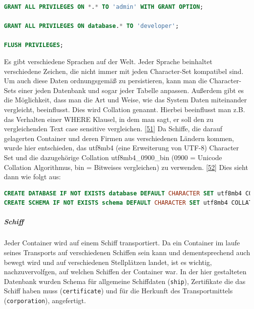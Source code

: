 \documentclass[
    headings=optiontotocandhead,%
    twoside,
    numbers=noenddot,%
    12pt, %
    titlepage, %
    parskip=full, %
    listof=leveldown, 
    numbers=noenddot, %
    a4paper,DIV=14,
    BCOR=15mm,
]{scrbook}
\newcommand{\passthrough}[1]{#1}
\begin{document}
\begin{lstlisting}[language=SQL, caption={Zuweisen von Rollen zu Benutzergruppen in MySQL}]
GRANT ALL PRIVILEGES ON *.* TO 'admin' WITH GRANT OPTION;

GRANT ALL PRIVILEGES ON database.* TO 'developer';

FLUSH PRIVILEGES;
\end{lstlisting}

Es gibt verschiedene Sprachen auf der Welt. Jeder Sprache beinhaltet
verschiedene Zeichen, die nicht immer mit jeden Character-Set kompatibel
sind. Um auch diese Daten ordnungsgemäß zu persistieren, kann man die
Character-Sets einer jeden Datenbank und sogar jeder Tabelle anpassen.
Außerdem gibt es die Möglichkeit, dass man die Art und Weise, wie das
System Daten miteinander vergleicht, beeinflusst. Dies wird Collation
genannt. Hierbei beeinflusst man z.B. das Verhalten einer WHERE Klausel,
in dem man sagt, er soll den zu vergleichenden Text case sensitive
vergleichen. {[}\protect\hyperlink{ref-DB-character-set}{51}{]} Da
Schiffe, die darauf gelagerten Container und deren Firmen aus
verschiedenen Ländern kommen, wurde hier entschieden, das utf8mb4 (eine
Erweiterung von UTF-8) Character Set und die dazugehörige Collation
utf8mb4\_0900\_bin (0900 = Unicode Collation Algorithmus, bin =
Bitweises vergleichen) zu verwenden.
{[}\protect\hyperlink{ref-mysql-character-set}{52}{]} Dies sieht dann
wie folgt aus:

\begin{lstlisting}[language=SQL, caption={Erstellen einer MySQL Datenbank mit abgeänderten Character Set und Collation}]
CREATE DATABASE IF NOT EXISTS database DEFAULT CHARACTER SET utf8mb4 COLLATE utf8mb4_0900_bin;
CREATE SCHEMA IF NOT EXISTS schema DEFAULT CHARACTER SET utf8mb4 COLLATE utf8mb4_0900_bin;
\end{lstlisting}

\hypertarget{schiff}{%
\subparagraph{Schiff}\label{schiff}}

Jeder Container wird auf einem Schiff transportiert. Da ein Container im
laufe seines Transports auf verschiedenen Schiffen sein kann und
dementsprechend auch bewegt wird und auf verschiedenen Stellplätzen
landet, ist es wichtig, nachzuvervolfgen, auf welchen Schiffen der
Container war. In der hier gestalteten Datenbank wurden Schema für
allgemeine Schiffdaten (\passthrough{\lstinline!ship!}), Zertifikate die
das Schiff haben muss (\passthrough{\lstinline!certificate!}) und für
die Herkunft des Transportmittels
(\passthrough{\lstinline!corporation!}), angefertigt.
\end{document}
